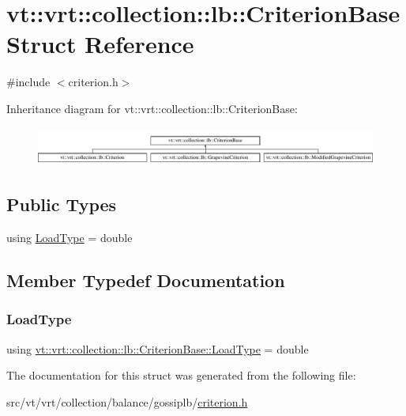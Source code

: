 \hypertarget{structvt_1_1vrt_1_1collection_1_1lb_1_1_criterion_base}{}\section{vt\+:\+:vrt\+:\+:collection\+:\+:lb\+:\+:Criterion\+Base Struct Reference}
\label{structvt_1_1vrt_1_1collection_1_1lb_1_1_criterion_base}


{\ttfamily \#include $<$criterion.\+h$>$}

Inheritance diagram for vt\+:\+:vrt\+:\+:collection\+:\+:lb\+:\+:Criterion\+Base\+:\begin{figure}[H]
\begin{center}
\leavevmode
\includegraphics[height=1.287356cm]{structvt_1_1vrt_1_1collection_1_1lb_1_1_criterion_base}
\end{center}
\end{figure}
\subsection*{Public Types}
\begin{DoxyCompactItemize}
\item 
using \hyperlink{structvt_1_1vrt_1_1collection_1_1lb_1_1_criterion_base_a78e6b14fc6f7b34acac1d7cd4e850180}{Load\+Type} = double
\end{DoxyCompactItemize}


\subsection{Member Typedef Documentation}
\mbox{\label{structvt_1_1vrt_1_1collection_1_1lb_1_1_criterion_base_a78e6b14fc6f7b34acac1d7cd4e850180}} 
\subsubsection{\texorpdfstring{Load\+Type}{LoadType}}
{\footnotesize\ttfamily using \hyperlink{structvt_1_1vrt_1_1collection_1_1lb_1_1_criterion_base_a78e6b14fc6f7b34acac1d7cd4e850180}{vt\+::vrt\+::collection\+::lb\+::\+Criterion\+Base\+::\+Load\+Type} =  double}



The documentation for this struct was generated from the following file\+:\begin{DoxyCompactItemize}
\item 
src/vt/vrt/collection/balance/gossiplb/\hyperlink{criterion_8h}{criterion.\+h}\end{DoxyCompactItemize}
